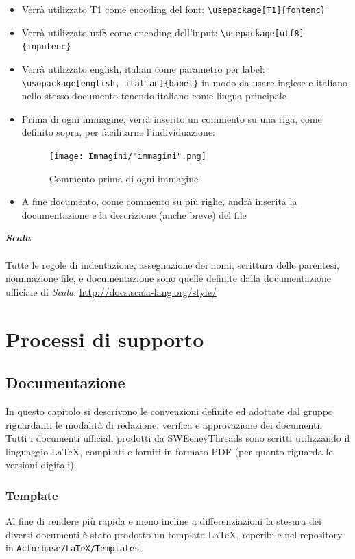 \documentclass[a4paper]{report}
\newcommand{\mychapter}[2]{
	\setcounter{chapter}{#1}
	\setcounter{section}{0}
	\setcounter{subsection}{1}
	\chapter*{#2}
	\addcontentsline{toc}{chapter}{#2}
}
\begin{document}
\begin{itemize}
\begin{figure}[h!]
		\end{figure}
		\item Verrà utilizzato T1 come encoding del font: \verb|\usepackage[T1]{fontenc}|
		\item Verrà utilizzato utf8 come encoding dell'input: \verb|\usepackage[utf8]{inputenc}|
		\item Verrà utilizzato english, italian come parametro per label: \verb|\usepackage[english, italian]{babel}| in modo da 
		usare inglese e italiano nello stesso documento tenendo italiano come lingua principale
		\item Prima di ogni immagine, verrà inserito un commento su una riga, come definito sopra, per facilitarne l'individuazione:
		\begin{figure}[h!]
			\centering
			\texttt{[image: Immagini/"immagini".png]}
			\caption{Commento prima di ogni immagine}
		\end{figure}
		\item A fine documento, come commento su più righe, andrà inserita la documentazione e la descrizione (anche breve) del file
	\end{itemize}
	\textbf{\emph{Scala}} \\ \\ 
	Tutte le regole di indentazione, assegnazione dei nomi, scrittura delle parentesi, nominazione file, e documentazione sono quelle
	definite dalla documentazione ufficiale di \emph{Scala}: \url{http://docs.scala-lang.org/style/}
	\mychapter{3}{Processi di supporto}
	\section{Documentazione} %
	In questo capitolo si descrivono le convenzioni definite ed adottate dal gruppo riguardanti le 
	modalità di redazione, verifica e approvazione dei documenti. \\
	Tutti i documenti ufficiali prodotti da SWEeneyThreads sono scritti utilizzando il linguaggio \LaTeX{}, compilati e
	forniti in formato PDF (per quanto riguarda le versioni digitali).
	\subsection{Template}
	Al fine di rendere più rapida e meno incline a differenziazioni la stesura dei diversi documenti è stato prodotto un
	template \LaTeX, reperibile nel repository in \verb|Actorbase/LaTeX/Templates| %
\end{document}
